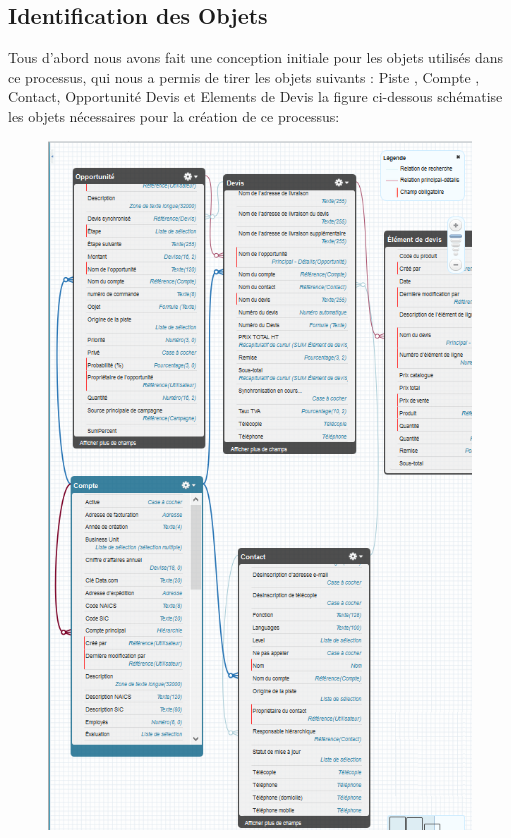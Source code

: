 \documentclass[a4paper, 12pt]{report}
\begin{document}
\begin{itemize}
\subsection{Identification des Objets}
Tous d'abord nous avons fait une conception initiale pour les objets utilisés dans ce processus, qui nous a permis de tirer les objets suivants :
Piste , Compte , Contact, Opportunité Devis et Elements de Devis
la figure ci-dessous schématise les objets nécessaires pour la création de ce processus:
\begin{figure}[H]
	\centering
		\includegraphics{classvente.PNG}
	\label{fig:classvente}
\end{figure}

\end{itemize}
\end{document}
